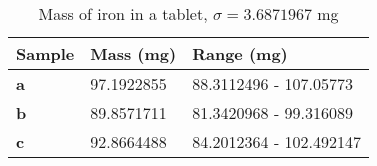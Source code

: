 \begin{table}[H]
    \centering
\begin{tabular}{l|ll}
\rowcolor[HTML]{FFC8F0} 
\textbf{Sample} & \textbf{Mass (mg)} & \textbf{Range (mg)}     \\ \hline
\rowcolor[HTML]{FFE6F8} 
\textbf{a}      & 97.1922855         & 88.3112496 - 107.05773  \\
\rowcolor[HTML]{FFE6F8} 
\textbf{b}      & 89.8571711         & 81.3420968 - 99.316089  \\
\rowcolor[HTML]{FFE6F8} 
\textbf{c}      & 92.8664488         & 84.2012364 - 102.492147
\end{tabular}
    \caption{Mass of iron in a tablet, $\sigma=3.6871967$ mg}
    \label{tab:all_mass}
\end{table}